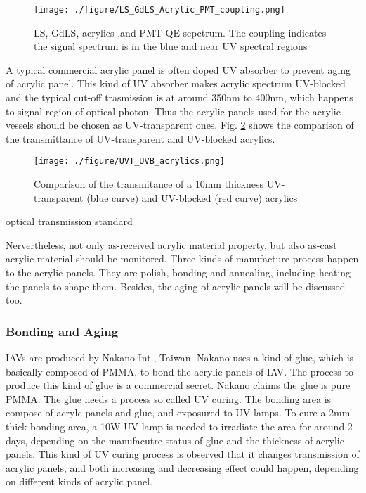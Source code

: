 \begin{figure}[h]
    \centering
    \texttt{[image: ./figure/LS\_GdLS\_Acrylic\_PMT\_coupling.png]}
    \caption{LS, GdLS, acrylics ,and PMT QE sepctrum. The coupling indicates the signal spectrum is in the blue and near UV spectral regions}
    \label{fig:SpectrumCoupling}
    \end{figure}


A typical commercial acrylic panel is often doped UV absorber
to prevent aging of acrylic panel. This kind of UV absorber makes acrylic spectrum
UV-blocked and the typical cut-off trasmission is at around 350nm to 400nm,
which happens to signal region of optical photon.
Thus the acrylic panels used for the acrylic vessels should be chosen as
UV-transparent ones. Fig. \ref{UVTUVBAcrylics} shows the comparison of the transmittance of UV-transparent
and UV-blocked acrylics.


\begin{figure}[h]
    \centering
    \texttt{[image: ./figure/UVT\_UVB\_acrylics.png]}
    \caption{Comparison of the transmitance of a 10mm thickness UV-transparent (blue curve) and UV-blocked (red curve) acrylics}
    \label{UVTUVBAcrylics}
    \end{figure}



optical transmission standard

Nervertheless, not only as-received acrylic material property, but also as-cast
acrylic material should be monitored. Three kinds of manufacture process happen to the acrylic panels.
They are polish, bonding and annealing, including heating the panels to shape them. Besides,
the aging of acrylic panels will be discussed too.

\subsubsection {Bonding and Aging}

IAVs are produced by Nakano Int., Taiwan. Nakano uses a kind of glue, which is basically
composed of PMMA, to bond the acrylic panels of IAV. The process to produce this kind of glue is a commercial
secret. Nakano claims the glue is pure PMMA. The glue needs a process so called UV curing. The bonding area
is compose of acrylc panels and glue, and exposured to UV lamps. To cure a 2mm thick bonding
area, a 10W UV lamp is needed to irradiate the area for around 2 days, depending on the manufacutre status of glue
and the thickness of acrylic panels. This kind of UV curing process is observed that it changes transmission of acrylic panels,
and both increasing and decreasing effect could happen, depending on different kinds of acrylic panel.



